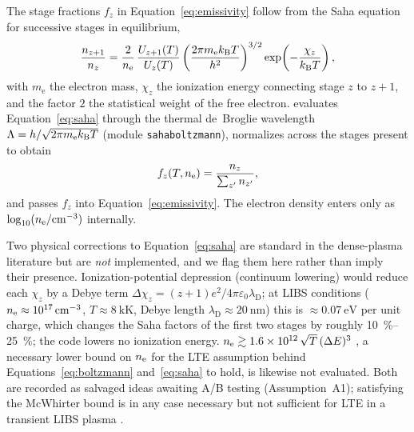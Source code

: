 The stage fractions $f_z$ in Equation~\eqref{eq:emissivity} follow from the Saha
equation \citep{saha1920ionization,griem1997principles} for successive stages in
equilibrium,
%
\begin{equation}
  \label{eq:saha}
  \frac{n_{z+1}}{n_z} =
    \frac{2}{n_{\mathrm{e}}}\,\frac{U_{z+1}(T)}{U_z(T)}
    \left(\frac{2\pi m_\mathrm{e}k_{\mathrm{B}} T}{h^2}\right)^{3/2}
    \exp\!\left(-\frac{\chi_z}{k_{\mathrm{B}} T}\right),
\end{equation}
%
with $m_\mathrm{e}$ the electron mass, $\chi_z$ the ionization energy connecting
stage $z$ to $z+1$, and the factor $2$ the statistical weight of the free electron.
\alibz{} evaluates Equation~\eqref{eq:saha} through the thermal de~Broglie wavelength
$\Lambda = h/\sqrt{2\pi m_\mathrm{e}k_{\mathrm{B}} T}$ (module \texttt{sahaboltzmann}), normalizes
across the stages present to obtain
%
\begin{equation}
  \label{eq:stage-fraction}
  f_z(T,n_{\mathrm{e}}) = \frac{n_z}{\sum_{z'} n_{z'}},
\end{equation}
%
and passes $f_z$ into Equation~\eqref{eq:emissivity}. The electron density enters
only as $\log_{10}(n_{\mathrm{e}}/\si{\per\cubic\centi\meter})$ internally.

Two physical corrections to Equation~\eqref{eq:saha} are standard in the dense-plasma
literature but are \emph{not} implemented, and we flag them here rather than imply
their presence. Ionization-potential depression (continuum lowering)
\citep{ecker1963lowering,stewart1966lowering} would reduce
each $\chi_z$ by a Debye term $\Delta\chi_z = (z+1)e^2/4\pi\varepsilon_0\lambda_\mathrm{D}$;
at LIBS conditions ($n_{\mathrm{e}}\approx\SI{e17}{\per\cubic\centi\meter}$,
$T\approx\SI{8}{\kilo\kelvin}$, Debye length $\lambda_\mathrm{D}\approx\SI{20}{\nano\meter}$)
this is $\approx\SI{0.07}{\electronvolt}$ per unit charge, which changes the Saha
factors of the first two stages by roughly \SIrange{10}{25}{\percent}; the code
lowers no ionization energy. %
$n_{\mathrm{e}} \gtrsim \SI{1.6e12}{}\,\sqrt{T}\,(\Delta E)^3$
\citep{mcwhirter1965spectral,griem1963validity,fujimoto1990validity}, a necessary lower
bound on
$n_{\mathrm{e}}$ for the LTE assumption behind Equations~\eqref{eq:boltzmann}
and~\eqref{eq:saha} to hold, is likewise not evaluated. Both are recorded as
salvaged ideas awaiting A/B testing (Assumption~A1); satisfying the McWhirter bound is
in any case necessary but not sufficient for LTE in a transient LIBS plasma
\citep{cristoforetti2010lte}.

